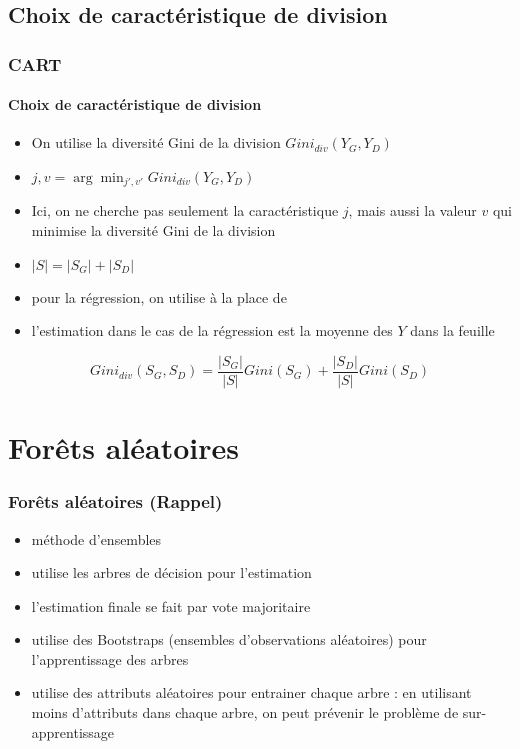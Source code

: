 \documentclass[xcolor=table]{beamer}
\begin{document}
\subsection{Choix de caractéristique de division}

\begin{frame}
	\frametitle{CART}
	\framesubtitle{Choix de caractéristique de division}
	
	\begin{itemize}
		\item On utilise la diversité Gini de la division $Gini_{div}(Y_G, Y_D)$
		\item $j, v = \arg\min_{j', v'} Gini_{div}(Y_G, Y_D)$
		\item Ici, on ne cherche pas seulement la caractéristique $j$, mais aussi la valeur $v$ qui minimise la diversité Gini de la division
		\item $|S| = |S_G| + |S_D|$
		\item pour la régression, on utilise  à la place de 
		\item l'estimation dans le cas de la régression est la moyenne des $Y$ dans la feuille
	\end{itemize}
	
	\[Gini_{div}(S_G, S_D) = \frac{|S_G|}{|S|} Gini(S_G) + \frac{|S_D|}{|S|} Gini(S_D)\]
	
	
\end{frame}

\section{Forêts aléatoires}

\begin{frame}
	\frametitle{Forêts aléatoires (Rappel)}
	
	\begin{itemize}
		\item méthode d'ensembles
		\item utilise les arbres de décision pour l'estimation
		\item l'estimation finale se fait par vote majoritaire 
		\item utilise des Bootstraps (ensembles d'observations aléatoires) pour l'apprentissage des arbres 
		\item utilise des attributs aléatoires pour entrainer chaque arbre : en utilisant moins d'attributs dans chaque arbre, on peut prévenir le problème de sur-apprentissage
	\end{itemize}
	
\end{frame}
\end{document}

